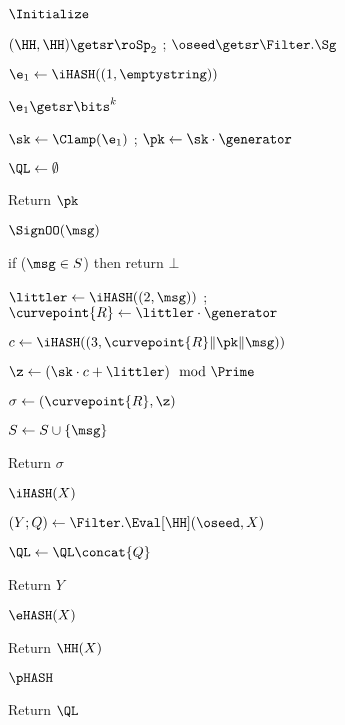 	
	\begin{figure}[t]
		{
			
			\begin{oracle}{$\Initialize$}
				\item 
				$(\HH,\HH)\getsr \roSp_2$ ;
				$\oseed \getsr \Filter.\Sg$
				\item $\e_1 \gets \iHASH((1, \emptystring))$ 
				\item $\e_1 \getsr \bits^k$
				\item $\sk \gets \Clamp(\e_1)$ ; $\pk \gets \sk\cdot \generator$
				\item $\QL \gets \emptyset$
				\item Return $\pk$
			\end{oracle}
			\ExptSepSpace
			
			\begin{oracle}{$\SignOO(\msg)$}
				\item if ($\msg \in S$) then return $\bot$
				\item $\littler \gets
				\iHASH((2, \msg))$ ; $\curvepoint{R} \gets \littler\cdot \generator$
				\item $c \gets 
			\iHASH((3,\curvepoint{R}\|\pk\|\msg))$
				
				\item $\z \gets (\sk \cdot c + \littler) \mod \Prime$
				\item $\sigma \gets (\curvepoint{R},\z)$
				\item $S \gets S \cup \{\msg\}$
				\item Return $\sigma$
			\end{oracle}
			\ExptSepSpace
			\begin{oracle}{$\iHASH(X)$}
				\item $(Y;Q) \gets \Filter.\Eval[\HH](\oseed,X)$
				\item $\QL \gets \QL \concat \{Q\}$
			\item Return $Y$
			\end{oracle}
			\ExptSepSpace
			
			\begin{oracle}{$\eHASH(X)$}
			    \item Return $\HH(X)$
		        \end{oracle}
		    \ExptSepSpace
		    
		    \begin{oracle}{$\pHASH$}
    			\item Return $\QL$
    		\end{oracle}
    		\ExptSepSpace
			
}
\end{figure}

